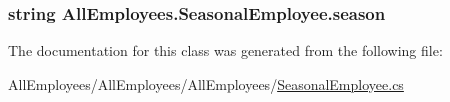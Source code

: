 \subsubsection[{season}]{\setlength{\rightskip}{0pt plus 5cm}string All\+Employees.\+Seasonal\+Employee.\+season}\label{class_all_employees_1_1_seasonal_employee_a7615ccd677faed6b26afa27aadd7a71e}


The documentation for this class was generated from the following file\+:\begin{DoxyCompactItemize}
\item 
All\+Employees/\+All\+Employees/\+All\+Employees/\hyperlink{_seasonal_employee_8cs}{Seasonal\+Employee.\+cs}\end{DoxyCompactItemize}
